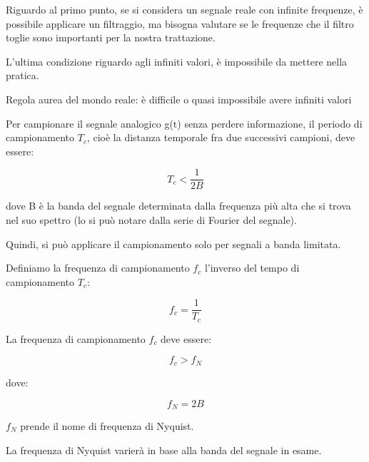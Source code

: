 Riguardo al primo punto, se si considera un segnale reale con infinite frequenze, 
è possibile applicare un filtraggio, ma bisogna valutare se le frequenze che il filtro toglie sono importanti per la nostra trattazione. \newline 

L'ultima condizione riguardo agli infiniti valori, è impossibile da mettere nella pratica. \newline 

\begin{tcolorbox}
    Regola aurea del mondo reale: è difficile o quasi impossibile avere infiniti valori
\end{tcolorbox}

Per campionare il segnale analogico g(t) senza perdere informazione, 
il periodo di campionamento $T_c$, cioè la distanza temporale fra due successivi campioni, deve essere: 

{
    \Large 
    \begin{equation}
        T_c < \frac{1}{2B}
    \end{equation}
}

dove B è la banda del segnale determinata dalla frequenza più alta che si trova nel suo spettro (lo si può notare dalla serie di Fourier del segnale). \newline 

Quindi, si può applicare il campionamento solo per segnali a banda limitata. \newline 

Definiamo la frequenza di campionamento $f_c$ l'inverso del tempo di campionamento $T_c$: 

{
    \Large 
    \begin{equation}
        f_c = \frac{1}{T_c}
    \end{equation}
}

La frequenza di campionamento $f_c$ deve essere:

{
    \Large 
    \begin{equation}
        f_c > f_N 
    \end{equation}
}

dove: 

{
    \Large 
    \begin{equation}
        f_N = 2B
    \end{equation}
}

$f_N$ prende il nome di frequenza di Nyquist. \newline 

La frequenza di Nyquist varierà in base alla banda del segnale in esame. \newline 

